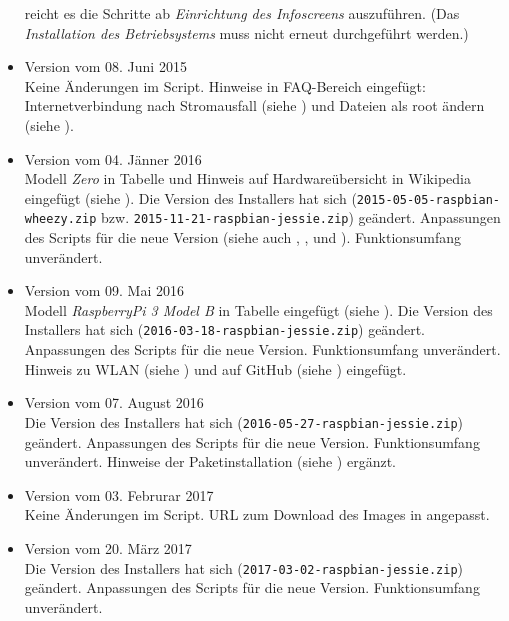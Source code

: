 \begin{itemize}
{		reicht es die Schritte ab  \textit{Einrichtung des Infoscreens} auszuführen.
		(Das  \textit{Installation des Betriebsystems} muss nicht erneut durchgeführt werden.)
		}
	\item {Version vom 08. Juni 2015\\ Keine Änderungen im Script.
		Hinweise in FAQ-Bereich eingefügt: Internetverbindung nach Stromausfall (siehe ) und Dateien als root ändern (siehe ).
 		}
	\item {Version vom 04. Jänner 2016\\ 
		Modell \textit{Zero} in Tabelle und Hinweis auf Hardwareübersicht in Wikipedia eingefügt (siehe ).
		Die Version des Installers hat sich (\lstinline|2015-05-05-raspbian-wheezy.zip| bzw. \lstinline|2015-11-21-raspbian-jessie.zip|) geändert. 
		Anpassungen des Scripts für die neue Version (siehe auch , ,  und ).
		Funktionsumfang unverändert.
 		}
	\item {Version vom 09. Mai 2016\\ 
		Modell \textit{RaspberryPi 3 Model B} in Tabelle eingefügt (siehe ).
		Die Version des Installers hat sich (\lstinline|2016-03-18-raspbian-jessie.zip|) geändert. 
		Anpassungen des Scripts für die neue Version.
		Funktionsumfang unverändert.
		Hinweis zu WLAN (siehe ) und auf GitHub (siehe ) eingefügt.
 		}
	\item {Version vom 07. August 2016\\ 
		Die Version des Installers hat sich (\lstinline|2016-05-27-raspbian-jessie.zip|) geändert. 
		Anpassungen des Scripts für die neue Version.
		Funktionsumfang unverändert.
		Hinweise der Paketinstallation (siehe ) ergänzt.
 		}
	\item {Version vom 03. Februrar 2017\\ Keine Änderungen im Script.
		URL zum Download des Images in  angepasst.
 		}
	\item {Version vom 20. März 2017\\ 
		Die Version des Installers hat sich (\lstinline|2017-03-02-raspbian-jessie.zip|) geändert. 
		Anpassungen des Scripts für die neue Version.
		Funktionsumfang unverändert.
 		}
\end{itemize}

